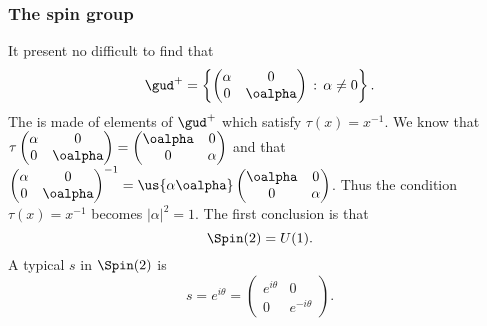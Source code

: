 \subsubsection{The spin group}

It present no difficult to find that
\begin{equation}
 \gud^+=\left\{\begin{pmatrix}
 \alpha & 0 \\
 0 & \oalpha
 \end{pmatrix}\,:\,\alpha\neq 0\right\}.
\end{equation}
The  is made of elements of $\gud^+$ which satisfy $\tau(x)=x^{-1}$. We know that
$\tau\begin{pmatrix}
\alpha & 0 \\
0 & \oalpha
\end{pmatrix} =\begin{pmatrix}
\oalpha & 0 \\
0 & \alpha
\end{pmatrix}$ and that $\begin{pmatrix}
\alpha & 0 \\
0 & \oalpha
\end{pmatrix}^{-1} =\us{\displaystyle\alpha\oalpha}\begin{pmatrix}
\oalpha & 0 \\
0 & \alpha
\end{pmatrix}$. Thus the condition \hbox{$\tau(x)=x^{-1}$} becomes $|\alpha|^2=1$. The first conclusion is that
\begin{equation}
                    \Spin(2)=U(1).
\end{equation}
A typical $s$ in $\Spin(2)$ is
\[s=e^{i\theta}=\begin{pmatrix}
e^{i\theta} & 0 \\
0 & e^{-i\theta}
\end{pmatrix}.\]

